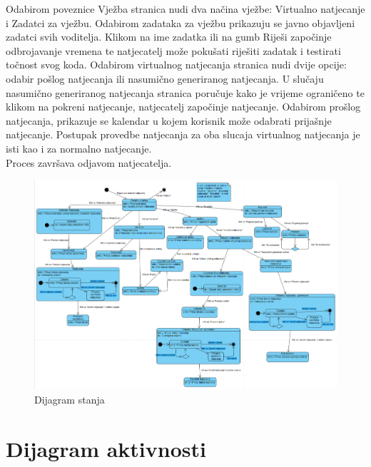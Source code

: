 {{		Odabirom poveznice Vježba stranica nudi dva načina vježbe: Virtualno natjecanje i Zadatci za vježbu. Odabirom zadataka za vježbu prikazuju se javno objavljeni zadatci svih voditelja. Klikom na ime zadatka ili na gumb Riješi započinje odbrojavanje vremena te natjecatelj može pokušati riješiti zadatak i testirati točnost svog koda. Odabirom virtualnog natjecanja stranica nudi dvije opcije: odabir pošlog natjecanja ili nasumično generiranog natjecanja. U slučaju nasumično generiranog natjecanja stranica poručuje kako je vrijeme ograničeno te klikom na pokreni natjecanje, natjecatelj započinje natjecanje. Odabirom prošlog natjecanja, prikazuje se kalendar u kojem korisnik može odabrati prijašnje natjecanje. Postupak provedbe natjecanja za oba slucaja virtualnog natjecanja je isti kao i za normalno natjecanje.\\ 
		Proces završava odjavom natjecatelja. 	
		}\\
		\begin{figure}[H]
			\includegraphics[scale=0.35]{slike/dijagram stanja}
			\centering
			\caption{Dijagram stanja}
			\label{fig:dijagramstanja}
		\end{figure}	 
		
		\section{Dijagram aktivnosti}
		
		}
